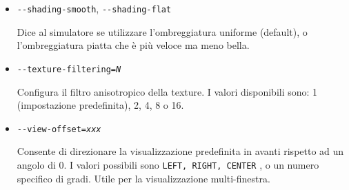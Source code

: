 {\begin{itemize}
  Definisce la risoluzione della finestra/schermo.
  Ad esempio \texttt{-$ $-geometry=1024x768}..

  \item{\texttt{-$ $-shading-smooth}, \texttt{-$ $-shading-flat}}

  Dice al simulatore se utilizzare l'ombreggiatura uniforme (default), o
  l'ombreggiatura piatta che \`{e} pi\`{u} veloce ma meno bella.

  \item{\texttt{-$ $-texture-filtering={\it N}}}

  Configura il filtro anisotropico della texture. I valori disponibili sono: 1
  (impostazione predefinita), 2, 4, 8 o 16.

  \item{\texttt{-$ $-view-offset={\it xxx}}}

  Consente di direzionare la visualizzazione predefinita in avanti
  rispetto ad un angolo di 0. I valori possibili sono \texttt{LEFT, RIGHT, CENTER}
  , o un numero specifico di gradi. Utile per la visualizzazione multi-finestra.

  \end{itemize}

}
